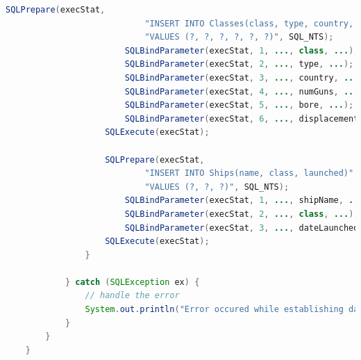 \documentclass[12pt]{article}
\begin{document}
\begin{enumerate}[1.]
\begin{enumerate}[a)]
\begin{lstlisting}[language=JAVA]
                    SQLPrepare(execStat,
                            "INSERT INTO Classes(class, type, country, numGuns, bore, displacement)"
                            "VALUES (?, ?, ?, ?, ?, ?)", SQL_NTS);
                        SQLBindParameter(execStat, 1, ..., class, ...);
                        SQLBindParameter(execStat, 2, ..., type, ...);
                        SQLBindParameter(execStat, 3, ..., country, ...);
                        SQLBindParameter(execStat, 4, ..., numGuns, ...);
                        SQLBindParameter(execStat, 5, ..., bore, ...);
                        SQLBindParameter(execStat, 6, ..., displacement, ...);
                    SQLExecute(execStat);

                    SQLPrepare(execStat,
                            "INSERT INTO Ships(name, class, launched)"
                            "VALUES (?, ?, ?)", SQL_NTS);
                        SQLBindParameter(execStat, 1, ..., shipName, ...);
                        SQLBindParameter(execStat, 2, ..., class, ...);
                        SQLBindParameter(execStat, 3, ..., dateLaunched, ...);
                    SQLExecute(execStat);
                }

            } catch (SQLException ex) {
                // handle the error
                System.out.println("Error occured while establishing database connection");
            }
        }
    }
    \end{lstlisting}
    \end{enumerate}

\end{enumerate}
\end{document}
